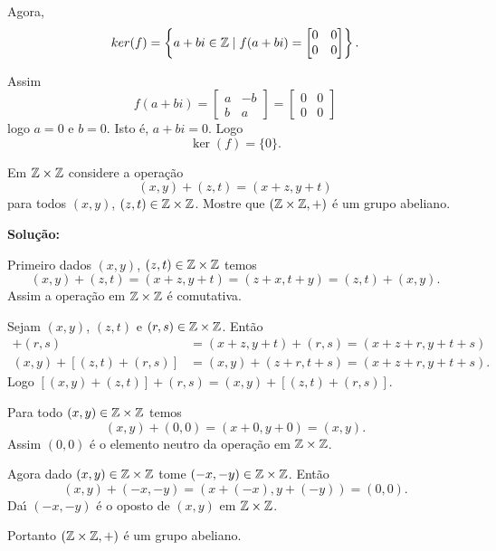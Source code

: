 \documentclass[12pt]{exam}
\begin{document}
Agora,
\[
	ker(f) = \left\{a + bi \in \mathbb{Z} \mid f(a + bi) = \begin{bmatrix}
		0 & 0\\
		0 & 0
	\end{bmatrix}\right\}.
\]

Assim
\[
	f(a + bi) = \begin{bmatrix}
		a & -b\\
		b & a
	\end{bmatrix} = \begin{bmatrix}
		0 & 0\\
		0 & 0
	\end{bmatrix}
\]
logo $a = 0$ e $b = 0$. Isto \'e, $a + bi = 0$. Logo 
\[
	\ker(f) = \{0\}.
\]

\vspace{1cm}

\questao{} Em $\mathbb{Z} \times\mathbb{Z}$ considere a opera\c{c}\~ao
\[
	(x, y) + (z, t) = (x + z, y + t)
\]
para todos $(x,y)$, $(z,t) \in \mathbb{Z}\times\mathbb{Z}$. Mostre que $(\mathbb{Z}\times\mathbb{Z}, +)$ \'e um grupo abeliano.

\noindent\textbf{Solu\c{c}\~ao:}

Primeiro dados $(x,y)$, $(z,t) \in \mathbb{Z}\times\mathbb{Z}$ temos
\[
	(x,y) + (z,t) = (x+z,y+t) = (z+x,t+y) = (z,t) + (x,y).
\]
Assim a opera\c{c}\~ao em $\mathbb{Z}\times\mathbb{Z}$ \'e comutativa.

Sejam $(x,y)$, $(z,t)$ e $(r,s) \in \mathbb{Z}\times\mathbb{Z}$. Ent\~ao
\begin{align*}
	[(x,y) + (z,t)] + (r,s) &= (x + z, y+t) + (r,s) = (x+z+r,y+t+s)\\
	(x,y) + [(z,t)+(r,s)] &= (x,y) + (z+r,t+s) = (x+z+r,y+t+s).
\end{align*}
Logo $[(x,y)+(z,t)] + (r,s) = (x,y) + [(z,t) + (r,s)]$.

Para todo $(x,y) \in \mathbb{Z}\times\mathbb{Z}$ temos
\[
	(x,y) + (0,0) = (x+0,y+0) = (x,y).
\]
Assim $(0,0)$ \'e o elemento neutro da opera\c{c}\~ao em $\mathbb{Z}\times\mathbb{Z}$.

Agora dado $(x,y) \in \mathbb{Z}\times\mathbb{Z}$ tome $(-x,-y) \in \mathbb{Z}\times\mathbb{Z}$. Ent\~ao
\[
	(x,y) + (-x,-y) = (x+(-x),y+(-y)) = (0,0).
\]
Da{\'\i} $(-x,-y)$ \'e o oposto de $(x,y)$ em $\mathbb{Z}\times\mathbb{Z}$.

Portanto $(\mathbb{Z}\times\mathbb{Z},+)$ \'e um grupo abeliano.
\end{document}
